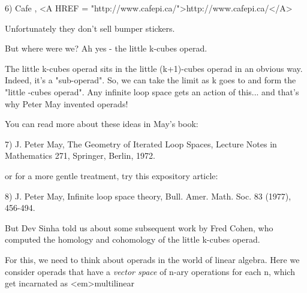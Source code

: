 6) Cafe \pi , <A HREF = "http://www.cafepi.ca/">http://www.cafepi.ca/</A>

Unfortunately they don't sell bumper stickers.

But where were we?  Ah yes - the little k-cubes operad.

The little k-cubes operad sits in the little (k+1)-cubes operad 
in an obvious way.  Indeed, it's a "sub-operad".  So, we can 
take the limit as k goes to \infty  and form the "little 
\infty -cubes operad".  Any infinite loop space gets an action 
of this... and that's why Peter May invented operads!

You can read more about these ideas in May's book:

7) J. Peter May, The Geometry of Iterated Loop Spaces, 
Lecture Notes in Mathematics 271, Springer, Berlin, 1972.

or for a more gentle treatment, try this expository article:

8) J. Peter May, Infinite loop space theory, Bull. Amer. Math. 
Soc. 83 (1977), 456-494.

But Dev Sinha told us about some subsequent work by Fred 
Cohen, who computed the homology and cohomology of the little
k-cubes operad.

For this, we need to think about operads in the world of linear 
algebra.  Here we consider operads that have a \emph{vector space} of 
n-ary operations for each n, which get incarnated as <em>multilinear


